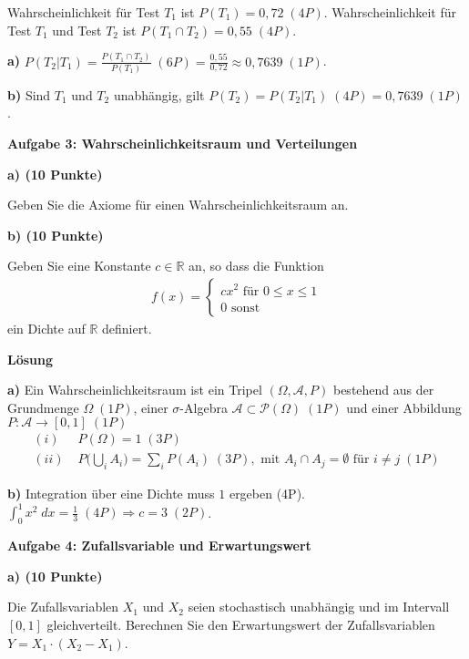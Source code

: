 \documentclass[a4paper,12pt]{article}
\begin{document}
Wahrscheinlichkeit für  Test $T_1$  ist $P(T_1) = 0,72  \; (4P)$. Wahrscheinlichkeit für  Test $T_1$ und Test $T_2$ ist $P(T_1 \cap T_2) = 0,55  \; (4P)$.

{\bf a) }
$P(T_2 | T_1) = \frac{P(T_1 \cap T_2)}{P(T_1)}  \; (6P)= \frac{0,55} {0,72} \approx 0,7639  \; (1P)$.


{\bf b) }
Sind $T_1$ und $T_2$ unabhängig, gilt  $P(T_2) = P(T_2 | T_1)  \; (4P) = 0,7639  \; (1P)$.

\hspace{10mm}

{\bf Aufgabe 3: Wahrscheinlichkeitsraum und Verteilungen}

{\bf a) (10 Punkte) }

Geben Sie die Axiome für einen Wahrscheinlichkeitsraum an. 

{\bf b) (10 Punkte) }

Geben Sie eine Konstante $c  \in \mathbb{R}$ an, so dass die Funktion 
\begin{align*}
f(x) = \begin{cases} c x^2 \text{ für }  0\leq x \leq 1 \\ 0 \text{ sonst}\end{cases}
\end{align*}
ein Dichte auf $\mathbb{R}$ definiert.


{\bf Lösung}

{\bf a) }
Ein Wahrscheinlichkeitsraum ist ein Tripel $(\Omega, \mathcal{A}, P) $ bestehend aus der Grundmenge $\Omega  \; (1P)$, einer $\sigma$-Algebra $\mathcal{A} \subset  \mathcal{P}(\Omega)  \; (1P)$ und einer Abbildung
$P : \mathcal{A} \to [0,1]  \; (1P)$
\begin{align*}
(i) & \; P(\Omega) = 1   \; (3P)\\
(ii) & \;  P \biggl(  \bigcup_i A_i  \biggr) = \sum_i P(A_i)  \; (3P), \text{ mit } A_i \cap A_j = \emptyset \text{ für } i \neq j  \; (1P)
\end{align*}

{\bf b) }
Integration über eine Dichte muss $1$ ergeben (4P).  
$\int_0^1 x^2 \; dx = \frac{1}{3}  \; (4P) \Rightarrow c = 3 \; (2P)$.


{\bf Aufgabe 4: Zufallsvariable und Erwartungswert}

{\bf a) (10  Punkte) }

Die Zufallsvariablen $X_1$ und $X_2$ seien stochastisch unabhängig   und im Intervall $[0,1]$ gleichverteilt.
Berechnen Sie den Erwartungswert der Zufallsvariablen $Y = X_1 \cdot (X_2 - X_1)$.
\end{document}
